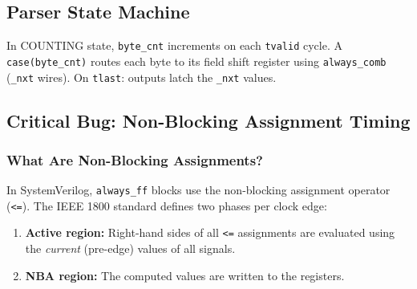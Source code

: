 \documentclass[11pt,a4paper]{article}
\begin{document}
\subsection{Parser State Machine}

\begin{center}
\end{center}

In COUNTING state, \texttt{byte\_cnt} increments on each \texttt{tvalid} cycle.
A \texttt{case(byte\_cnt)} routes each byte to its field shift register using
\texttt{always\_comb} (\texttt{\_nxt} wires). On \texttt{tlast}: outputs latch
the \texttt{\_nxt} values.

\subsection{Critical Bug: Non-Blocking Assignment Timing}
\label{sec:nba}

\subsubsection{What Are Non-Blocking Assignments?}

In SystemVerilog, \texttt{always\_ff} blocks use the non-blocking assignment
operator (\texttt{<=}). The IEEE 1800 standard defines two phases per clock edge:

\begin{enumerate}
  \item \textbf{Active region:} Right-hand sides of all \texttt{<=} assignments
    are evaluated using the \emph{current} (pre-edge) values of all signals.
  \item \textbf{NBA region:} The computed values are written to the registers.
\end{enumerate}
\end{document}

